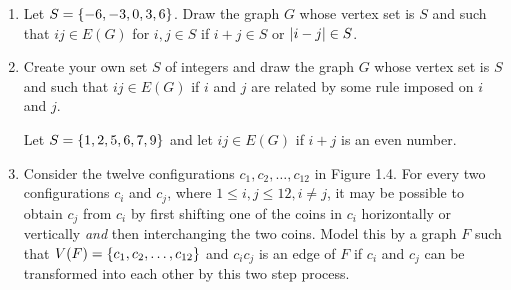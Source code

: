\documentclass[letterpaper,12pt,fleqn]{article}
\begin{document}
\begin{enumerate}
  \bigskip

\item Let \(S=\{-6,-3,0,3,6\}\).  Draw the graph \(G\) whose vertex set is \(S\) and such that \(ij\in E(G)\) for
  \(i,j\in S\) if \(i+j\in S\) or \(\lvert i-j\rvert\in S\).

  \bigskip
  
  \begin{center}
  \end{center}

  \bigskip

\item Create your own set \(S\) of integers and draw the graph \(G\) whose vertex set is \(S\) and such that
  \(ij\in E(G)\) if \(i\) and \(j\) are related by some rule imposed on \(i\) and \(j\).

  \bigskip

  Let \(S=\{1,2,5,6,7,9\}\) and let \(ij\in E(G)\) if \(i+j\) is an even number.

  \bigskip
  
  \begin{center}
  \end{center}

  \bigskip

\item Consider the twelve configurations \(c_1,c_2,\ldots,c_{12}\) in Figure 1.4.  For every two configurations
  \(c_i\) and \(c_j\), where \(1\le i,j\le12, i\ne j\), it may be possible to obtain \(c_j\) from \(c_i\) by first
  shifting one of the coins in \(c_i\) horizontally or vertically \emph{and} then interchanging the two coins.
  Model this by a graph \(F\) such that \(V(F)=\{c_1,c_2,\ldots,c_{12}\}\) and \(c_ic_j\) is an edge of \(F\) if
  \(c_i\) and \(c_j\) can be transformed into each other by this two step process.


\end{enumerate}
\end{document}
